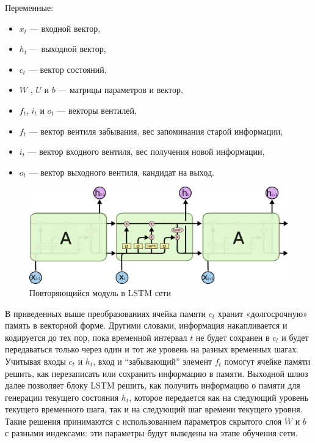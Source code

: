 Переменные:
\begin{itemize}
\item $ {\displaystyle x_{t}} $ — входной вектор,
\item $ {\displaystyle h_{t}}  $ — выходной вектор,
\item $ {\displaystyle c_{t}}  $ — вектор состояний,
\item $ {\displaystyle W } $ , $ {\displaystyle U }$ и $ {\displaystyle b} $ — матрицы параметров и вектор,
\item $ {\displaystyle f_{t}}  $, $ {\displaystyle i_{t}} $ и $ {\displaystyle o_{t}} $ — векторы вентилей,
\item $ {\displaystyle f_{t}}  $ — вектор вентиля забывания, вес запоминания старой информации,
\item $ {\displaystyle i_{t}}  $ — вектор входного вентиля, вес получения новой информации,
\item $ {\displaystyle o_{t}} $ — вектор выходного вентиля, кандидат на выход.
\end{itemize}
\begin{figure}[h]
	\centering
	\includegraphics[width=0.95\linewidth]{img/lstm}
	\caption{Повторяющийся модуль в LSTM сети}
	\label{fig:lstm}
\end{figure}

В приведенных выше преобразованиях ячейка памяти $ c_t $ хранит «долгосрочную» память в векторной форме. Другими словами, информация накапливается и кодируется до тех пор, пока временной интервал $ t $ не будет сохранен в $ c_t $ и будет передаваться только через один и тот же уровень на разных временных шагах.
Учитывая входы $ c_t $ и $ h_t $, вход и “забывающий” элемент $ f_t $ помогут ячейке памяти решить, как перезаписать или сохранить информацию в памяти. Выходной шлюз далее позволяет блоку LSTM решить, как получить информацию о памяти для генерации текущего состояния $ h_t $, которое передается как на следующий уровень текущего временного шага, так и на следующий шаг времени текущего уровня. Такие решения принимаются с использованием параметров скрытого слоя $ W $ и $ b $ с разными индексами: эти параметры будут выведены на этапе обучения сети.

